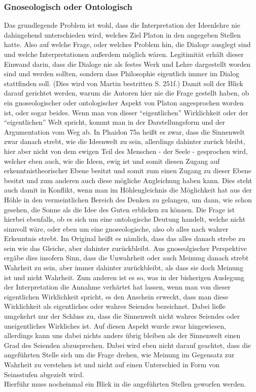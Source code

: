 \subsubsection{Gnoseologisch oder Ontologisch}
Das grundlegende Problem ist wohl, dass die Interpretation der Ideenlehre nie dahingehend unterschieden wird, welches Ziel Platon in den angegeben Stellen hatte. Also auf welche Frage, oder welches Problem hin, die Dialoge ausglegt sind und welche Interpretationen außerdem möglich wären. Legitimität erhält dieser Einwand darin, dass die Dialoge nie als festes Werk und Lehre dargestellt worden sind und werden sollten, sondern dass Philosophie eigentlich immer im Dialog stattfinden soll. (Dies wird von Martin bestritten S. 251f.) Damit soll der Blick darauf gerichtet werden, warum die Autoren hier nie die Frage gestellt haben, ob ein gnoseologischer oder ontologischer Aspekt von Platon angesprochen worden ist, oder sogar beides.  
Wenn man von dieser \enquote{eigentlichen} Wirklichkeit oder der \enquote{eigentlichen} Welt spricht, kommt man in der Darstellungsform und der Argumentation vom Weg ab. In Phaidon 75a heißt es zwar, dass die Sinnenwelt zwar danach strebt, wie die Ideenwelt zu sein, allerdings dahinter zurück bleibt, hier aber nicht von dem ewigen Teil des Menschen - der Seele - gesprochen wird, welcher eben auch, wie die Ideen, ewig ist und somit diesen Zugang auf erkenntnistheorischer Ebene besitzt und somit zum einen Zugang zu dieser Ebene besitzt und zum anderen auch diese mögliche Angleichung haben kann. Dies steht auch damit in Konflikt, wenn man im Höhlengleichnis die Möglichkeit hat aus der Höhle in den vermeintlichen Bereich des Denken zu gelangen, um dann, wie schon gesehen, die Sonne als die Idee des Guten erblicken zu können. Die Frage ist hierbei ebenfalls, ob es sich um eine ontologische Deutung handelt, welche nicht sinnvoll wäre, oder eben um eine gnoseologische, also ob alles nach wahrer Erkenntnis strebt. Im Original heißt es nämlich, dass das alles danach strebe zu sein wie das Gleiche, aber dahinter zurückbleibt. Aus gnoseolgischer Perspektive ergäbe dies insofern Sinn, dass die Unwahrheit oder auch Meinung danach strebt Wahrheit zu sein, aber immer dahinter zurückbleibt, als dass sie doch Meinung ist und nicht Wahrheit. 
Zum anderen ist es so, was in der bisherigen Auslegung der Interpretation die Annahme verhärtet hat lassen, wenn man von dieser eigentlichen Wirklichkeit spricht, es den Anschein erweckt, dass man diese Wirklichkeit als eigentliches oder wahres Seiendes bezeichnet. Dabei ließe umgekehrt nur der Schluss zu, dass die Sinnenwelt nicht wahres Seiendes oder uneigentliches Wirkliches ist. Auf diesen Aspekt wurde zwar hingewiesen, allerdings kann uns dabei nichts anders übrig bleiben als der Sinnenwelt einen Grad des Seienden abzusprechen. Dabei wird eben nicht darauf geachtet, dass die angeführten Stelle sich um die Frage drehen, wie Meinung im Gegensatz zur Wahrheit zu verstehen ist und nicht auf einen Unterschied in Form von Seinsstufen abgezielt wird.\\ Hierführ muss nocheinmal ein Blick in die angeführten Stellen geworfen werden. 
